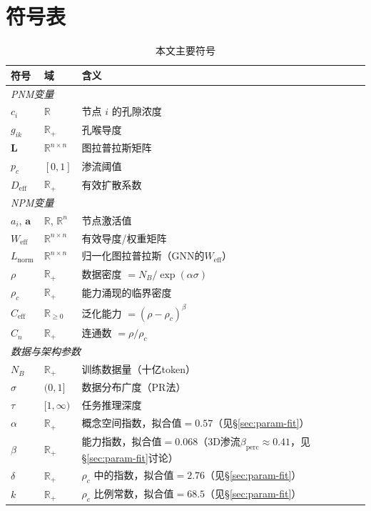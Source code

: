 \documentclass[11pt,a4paper]{article}
\newcommand{\Weff}{W_{\text{eff}}}
\newcommand{\Ceff}{C_{\text{eff}}}
\newcommand{\rhoc}{\rho_c}
\newcommand{\Lnorm}{L_{\text{norm}}}
\begin{document}
\section*{符号表}
\begin{table}[H]
\centering
\caption{本文主要符号}
\small
\begin{tabular}{llp{7cm}}
\toprule
\textbf{符号} & \textbf{域} & \textbf{含义} \\
\midrule
\multicolumn{3}{l}{\textit{PNM变量}} \\
$c_i$       & $\mathbb{R}$      & 节点 $i$ 的孔隙浓度 \\
$g_{ik}$    & $\mathbb{R}_{+}$  & 孔喉导度 \\
$\mathbf{L}$& $\mathbb{R}^{n\times n}$ & 图拉普拉斯矩阵 \\
$p_c$       & $[0,1]$           & 渗流阈值 \\
$D_{\text{eff}}$ & $\mathbb{R}_{+}$ & 有效扩散系数 \\
\midrule
\multicolumn{3}{l}{\textit{NPM变量}} \\
$a_i$, $\mathbf{a}$ & $\mathbb{R}$, $\mathbb{R}^n$ & 节点激活值 \\
$\Weff$    & $\mathbb{R}^{n\times n}$ & 有效导度/权重矩阵 \\
$\Lnorm$   & $\mathbb{R}^{n\times n}$ & 归一化图拉普拉斯（GNN的$\Weff$） \\
$\rho$      & $\mathbb{R}_{+}$  & 数据密度 $= N_B/\exp(\alpha\sigma)$ \\
$\rhoc$    & $\mathbb{R}_{+}$  & 能力涌现的临界密度 \\
$\Ceff$ & $\mathbb{R}_{\geq0}$ & 泛化能力 $= (\rho-\rhoc)^\beta$ \\
$C_n$       & $\mathbb{R}_{+}$  & 连通数 $= \rho/\rhoc$ \\
\midrule
\multicolumn{3}{l}{\textit{数据与架构参数}} \\
$N_B$       & $\mathbb{R}_{+}$  & 训练数据量（十亿token） \\
$\sigma$    & $(0,1]$           & 数据分布广度（PR法） \\
$\tau$      & $[1,\infty)$      & 任务推理深度 \\
$\alpha$    & $\mathbb{R}_{+}$  & 概念空间指数，拟合值$=0.57$（见\S\ref{sec:param-fit}） \\
$\beta$     & $\mathbb{R}_{+}$  & 能力指数，拟合值$=0.068$（3D渗流$\beta_{\text{perc}}\approx0.41$，见\S\ref{sec:param-fit}讨论） \\
$\delta$    & $\mathbb{R}_{+}$  & $\rhoc$ 中的指数，拟合值$=2.76$（见\S\ref{sec:param-fit}） \\
$k$         & $\mathbb{R}_{+}$  & $\rhoc$ 比例常数，拟合值$=68.5$（见\S\ref{sec:param-fit}） \\
\bottomrule
\end{tabular}
\end{table}
\end{document}
